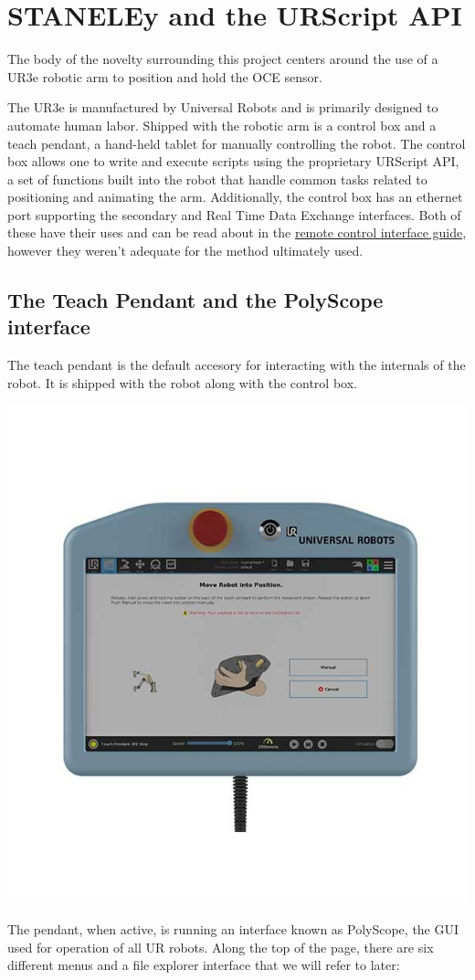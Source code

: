 \documentclass[11pt]{article}
\begin{document}
\section{STANELEy and the URScript API}\label{sec:robot_summary}

The body of the novelty surrounding this project centers around the use of a UR3e robotic arm to position and hold the OCE sensor.

The UR3e is manufactured by Universal Robots and is primarily designed to automate human labor. Shipped with the robotic arm is a control box and a teach pendant, a hand-held tablet for manually controlling the robot. The control box allows one to write and execute scripts using the proprietary URScript API, a set of functions built into the robot that handle common tasks related to positioning and animating the arm.
Additionally, the control box has an ethernet port supporting the secondary and Real Time Data Exchange interfaces. Both of these have their uses and can be read about in the \hyperlink{https://www.universal-robots.com/articles/ur/interface-communication/remote-control-via-tcpip/}{remote control interface guide}, however they weren't adequate for the method ultimately used. \\

\subsection{The Teach Pendant and the PolyScope interface}\label{sec:pendant}
The teach pendant is the default accesory for interacting with the internals of the robot. It is shipped with the robot along with the control box.
\begin{center}
\includegraphics[width=.8\linewidth]{figures/teach_pendant.jpg}
\end{center}
The pendant, when active, is running an interface known as PolyScope, the GUI used for operation of all UR robots. Along the top of the page, there are six different menus and a file explorer interface that we will refer to later:
\end{document}
